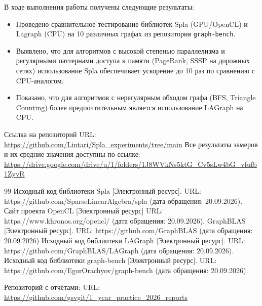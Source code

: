 \documentclass[a4paper]{article}
\begin{document}
	В ходе выполнения работы получены следующие результаты:
	
	\begin{itemize}
		\item Проведено сравнительное тестирование библиотек Spla (GPU/OpenCL) и Lagraph (CPU) на 10 различных графах из репозитория \texttt{graph-bench}.
		\item Выявлено, что для алгоритмов с высокой степенью параллелизма и регулярными паттернами доступа к памяти (PageRank, SSSP на дорожных сетях) использование Spla обеспечивает ускорение до 10 раз по сравнению с CPU-аналогом.
		\item Показано, что для алгоритмов с нерегулярным обходом графа (BFS, Triangle Counting) более предпочтительным является использование LAGraph на CPU.
	\end{itemize}
	
	Ссылка на репозиторий URL: \url{https://github.com/Lintari/Spla_experiments/tree/main}
	Все результаты замеров и их средние значения доступны по ссылке: \url{https://drive.google.com/drive/u/1/folders/1J8WVkNs5ktG_Cv5sLw4bG_vfufb1ZyvR}
	
	
	\begin{thebibliography}{99}
		 Исходный код библиотеки Spla [Электронный ресурс]. URL: https://github.com/SparseLinearAlgebra/spla (дата обращения: 20.09.2026).
		 Сайт проекта OpenCL [Электронный ресурс]   URL: https://www.khronos.org/opencl/ (дата обращения: 20.09.2026).	
		 GraphBLAS [Электронный ресурс]. URL: https://github.com/GraphBLAS (дата обращения: 20.09.2026)
		 Исходный код библиотеки LAGraph [Электронный ресурс]. URL: https://github.com/GraphBLAS/LAGraph (дата обращения: 20.09.2026).
		 Исходный код библиотеки graph-bench [Электронный ресурс]. URL: https://github.com/EgorOrachyov/graph-bench (дата обращения: 20.09.2026).
		
	\end{thebibliography}
	
	Репозиторий с отчётами: URL: \url{https://github.com/gsvgit/1_year_practice_2026_reports}
\end{document}
